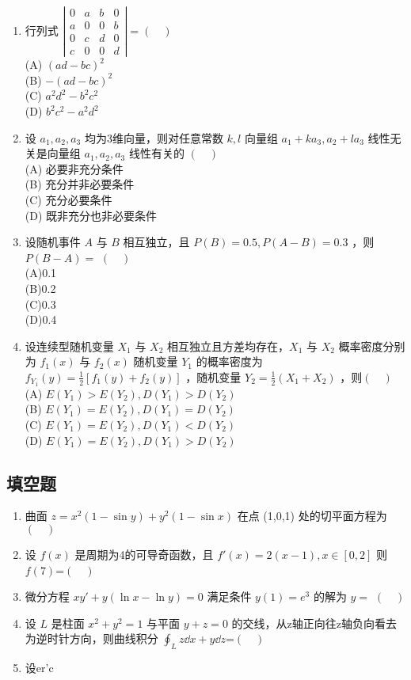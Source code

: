 \begin{enumerate}
\item 行列式 $ \left|\begin{array}{llll}0 & a & b & 0 \\ a & 0 & 0 & b \\ 0 & c & d & 0 \\ c & 0 & 0 & d\end{array}\right|=(\quad)$\\
(A) $(ad-bc)^2$\\
(B) $-(ad-bc)^2$\\
(C) $a^2d^2-b^2c^2$\\
(D) $b^2c^2-a^2d^2$
\item 设 $a_1,a_2,a_3$ 均为3维向量，则对任意常数 $k,l$ 向量组 $a_1+ka_3,a_2+la_3$ 线性无关是向量组 $a_1,a_2,a_3$ 线性有关的 $(\quad)$\\
(A) 必要非充分条件\\
(B) 充分并非必要条件\\
(C) 充分必要条件\\
(D) 既非充分也非必要条件
\item 设随机事件 $A$ 与 $B$ 相互独立，且 $P(B)=0.5,P(A-B)=0.3$ ，则$P(B-A)=$ $(\quad)$\\
(A)0.1\\
(B)0.2\\
(C)0.3\\
(D)0.4
\item 设连续型随机变量 $X_1$ 与 $X_2$ 相互独立且方差均存在，$X_1$  与 $X_2$ 概率密度分别为 $f_1(x)$ 与 $f_2(x)$ 随机变量 $Y_1$ 的概率密度为 $f_{Y_1}(y)=\frac{1}{2}[f_1(y)+f_2(y)]$ ，随机变量 $Y_2=\frac{1}{2}(X_1+X_2)$ ，则$(\quad)$\\
(A) $E(Y_1)>E(Y_2),D(Y_1)>D(Y_2)$\\
(B) $E(Y_1)=E(Y_2),D(Y_1)=D(Y_2)$\\
(C) $E(Y_1)=E(Y_2),D(Y_1)<D(Y_2)$\\
(D) $E(Y_1)=E(Y_2),D(Y_1)>D(Y_2)$

\end{enumerate}
\subsection{填空题}
\begin{enumerate}
\item 曲面 $z=x^2(1-\sin y)+y^2(1-\sin x)$  在点 (1,0,1) 处的切平面方程为$(\quad)$
\item 设 $f(x)$ 是周期为4的可导奇函数，且 $f'(x)=2(x-1),x \in [0,2]$  则 $f(7)$=$(\quad)$
\item 微分方程 $xy'+y(\ln x-\ln y)=0$ 满足条件 $y(1)=e^3$ 的解为 $y=$ $(\quad)$
\item 设 $L$ 是柱面 $x^2+y^2=1$ 与平面 $y+z=0$ 的交线，从z轴正向往z轴负向看去为逆时针方向，则曲线积分 $\displaystyle \oint_L z\dd{x}+y\dd{z}$=$(\quad)$
\item 设er'c
\end{enumerate}
